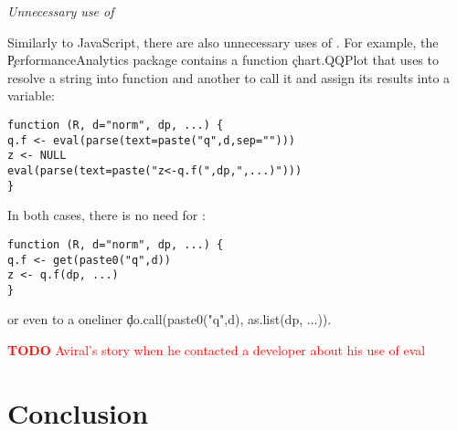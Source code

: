 \documentclass[review,nonacm,screen,acmsmall,anonymous=true]{acmart}
\newcommand{\mypara}[1]{\medskip\noindent\emph{#1}\xspace}
\newcommand{\authorcomment}[3]{\xspace\textcolor{#1}{{\bf #2} #3}\xspace}
\newcommand{\todo}[1]{\authorcomment{red}{TODO}{#1}}
\begin{document}

\mypara{Unnecessary use of \eval}

Similarly to JavaScript, there are also unnecessary uses of \eval. For example,
the \c{PerformanceAnalytics} package contains a function \c{chart.QQPlot} that
uses \eval to resolve a string into function and another to call it and assign
its results into a variable:
\begin{lstlisting}
function (R, d="norm", dp, ...) {
q.f <- eval(parse(text=paste("q",d,sep="")))
z <- NULL
eval(parse(text=paste("z<-q.f(",dp,",...)")))
}
\end{lstlisting}
  In both cases, there is no need for \eval:
\begin{lstlisting}
function (R, d="norm", dp, ...) {
q.f <- get(paste0("q",d))
z <- q.f(dp, ...)
}
\end{lstlisting}
or even to a oneliner \c{do.call(paste0("q",d), as.list(dp, ...))}.

\todo{Aviral's story when he contacted a developer about his use of eval}

\section{Conclusion}


\end{document}
